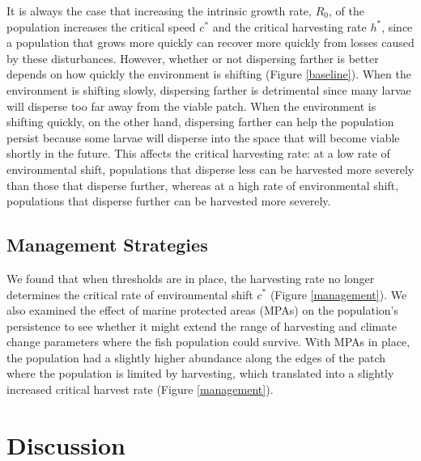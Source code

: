 \documentclass[12pt,english]{article}
\begin{document}
It is always the case that increasing the intrinsic growth rate, $R_0$, of the population increases the critical 
speed $c^*$ and the critical harvesting rate $h^*$, since a population that grows more quickly can recover 
more quickly from losses caused by these disturbances. However, whether or not dispersing farther is better 
depends on how quickly the environment is shifting (Figure \ref{baseline}). When the environment is shifting 
slowly, dispersing farther is detrimental since many larvae will disperse too far away from the viable patch. 
When the environment is shifting quickly, on the other hand, dispersing farther can help the population persist 
because some larvae will disperse into the space that will become viable shortly in the future.  This affects the critical harvesting rate: at a low rate of environmental shift, populations that disperse less can be harvested more severely than those that disperse further, whereas at a high rate of environmental shift, populations that disperse further can be harvested more severely.

\subsection{Management Strategies }

We found that when thresholds are in place, the harvesting rate no longer determines the critical rate of environmental shift $c^*$ (Figure \ref{management}). We also examined the effect of marine protected  areas (MPAs) on the population's persistence to see whether it might extend the range of harvesting and  climate change parameters where the fish population could survive. With MPAs in place, the population had a  slightly higher abundance along the edges of the patch where the population is limited by harvesting, which  translated into a slightly increased critical harvest rate (Figure \ref{management}).

\section{Discussion}
\end{document}
